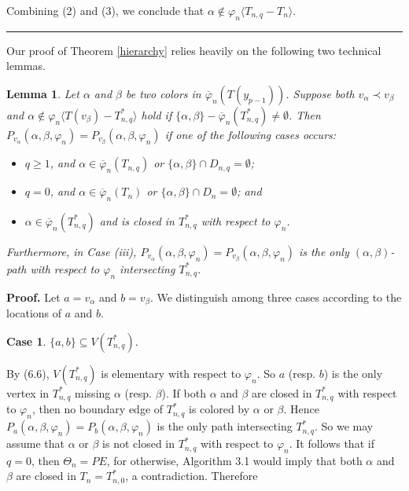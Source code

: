 \documentclass[11pt]{article}
\newtheorem{lemma}[theorem]{Lemma}
\newcommand{\phibar}{\overline{\varphi}}
\def\qed{\hfill \rule{4pt}{7pt}}
\begin{document}
Combining (2) and (3), we conclude that $\alpha \notin \varphi_n \langle T_{n,q}- T_n \rangle$.  \qed

\vskip 3mm
Our proof of Theorem \ref{hierarchy} relies heavily on the following two technical lemmas.

\begin{lemma}\label{change}
Let $\alpha$ and $\beta$ be two colors in $\phibar_n(T(y_{p-1}))$. Suppose both $v_{\alpha} \prec v_{\beta}$ and $\alpha
\notin \varphi_n \langle T(v_{\beta}) -  T_{n,q}^* \rangle$ hold if $\{\alpha, \beta\}-\overline{\varphi}_n(T_{n,q}^*)
\ne \emptyset$. Then $P_{v_{\alpha}}(\alpha,\beta,\varphi_n)=P_{v_{\beta}}(\alpha,\beta,\varphi_n)$ if one of the 
following cases occurs:
\begin{itemize}
\vspace{-1.5mm}
\item[(i)] $q\geq 1$, and $\alpha\in \phibar_n(T_{n,q})$ or $\{\alpha, \beta\}\cap D_{n,q}=\emptyset$;
\vspace{-2mm}		
\item[(ii)] $q=0$, and $\alpha\in \phibar_n(T_{n})$ or $\{\alpha, \beta\} \cap D_{n}=\emptyset$; and
\vspace{-1.5mm}
\item[(iii)] $\alpha \in \phibar_n(T_{n,q}^*)$ and is closed in $T_{n,q}^*$ with respect to $\varphi_n$.
\vspace{-1.5mm}
\end{itemize}
Furthermore, in Case (iii), $P_{v_{\alpha}}(\alpha,\beta,\varphi_n)=P_{v_{\beta}}(\alpha,\beta,\varphi_n)$
is the only $(\alpha,\beta)$-path with respect to $\varphi_n$ intersecting $T_{n,q}^*$.
\end{lemma}

{\bf Proof.} Let $a=v_{\alpha}$ and $b=v_{\beta}$. We distinguish among three cases according to 
the locations of $a$ and $b$.


{\bf Case 1}. 	$\{a,b\} \subseteq V(T_{n,q}^*)$. 
	
By (6.6), $V(T_{n,q}^*)$ is elementary with respect to $\varphi_n$. So $a$ (resp. $b$) is the only vertex in $T_{n,q}^*$ 
missing $\alpha$ (resp. $\beta$). If both $\alpha$ and $\beta$ are closed in $T_{n,q}^*$ with respect to
$\varphi_n$, then no boundary edge of $T_{n,q}^*$ is colored by $\alpha$ or $\beta$. Hence  $P_{a}(\alpha,\beta,\varphi_n)=P_{b}(\alpha,\beta,\varphi_n)$ is the only path intersecting $T_{n,q}^*$. 
So we may assume that $\alpha$ or $\beta$ is not closed in $T_{n,q}^*$ with respect to $\varphi_n$. 
It follows that if $q=0$, then $\Theta_n=PE$, for otherwise, Algorithm 3.1 would imply that
both $\alpha$ and $\beta$ are closed in $T_{n}=T_{n,0}^*$, a contradiction. Therefore 
\end{document}
